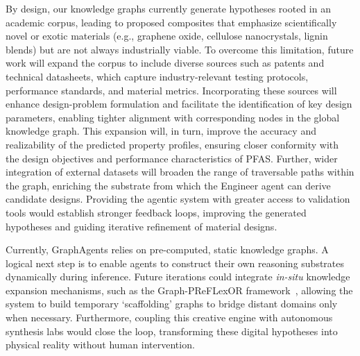 By design, our knowledge graphs currently generate hypotheses rooted in an academic corpus, leading to proposed composites that emphasize scientifically novel or exotic materials (e.g., graphene oxide, cellulose nanocrystals, lignin blends) but are not always industrially viable. To overcome this limitation, future work will expand the corpus to include diverse sources such as patents and technical datasheets, which capture industry-relevant testing protocols, performance standards, and material metrics. Incorporating these sources will enhance design-problem formulation and facilitate the identification of key design parameters, enabling tighter alignment with corresponding nodes in the global knowledge graph. This expansion will, in turn, improve the accuracy and realizability of the predicted property profiles, ensuring closer conformity with the design objectives and performance characteristics of PFAS. Further, wider integration of external datasets will broaden the range of traversable paths within the graph, enriching the substrate from which the Engineer agent can derive candidate designs. Providing the agentic system with greater access to validation tools would establish stronger feedback loops, improving the generated hypotheses and guiding iterative refinement of material designs. 

Currently, GraphAgents relies on pre-computed, static knowledge graphs. A logical next step is to enable agents to construct their own reasoning substrates dynamically during inference. Future iterations could integrate \textit{in-situ} knowledge expansion mechanisms, such as the Graph-PReFLexOR framework~\cite{Buehler2025GraphPRefLexOR,Buehler2025Chaos}, allowing the system to build temporary `scaffolding' graphs to bridge distant domains only when necessary. Furthermore, coupling this creative engine with autonomous synthesis labs would close the loop, transforming these digital hypotheses into physical reality without human intervention.